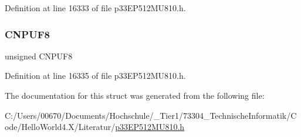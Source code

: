Definition at line 16333 of file p33\+E\+P512\+M\+U810.\+h.

\mbox{\label{structtag_c_n_p_u_f_b_i_t_s_a4debecf6737596811c06632883f11d3f}} 
\subsubsection{\texorpdfstring{C\+N\+P\+U\+F8}{CNPUF8}}
{\footnotesize\ttfamily unsigned C\+N\+P\+U\+F8}



Definition at line 16335 of file p33\+E\+P512\+M\+U810.\+h.



The documentation for this struct was generated from the following file\+:\begin{DoxyCompactItemize}
\item 
C\+:/\+Users/00670/\+Documents/\+Hochschule/\+\_\+\+Tier1/73304\+\_\+\+Technische\+Informatik/\+Code/\+Hello\+World4.\+X/\+Literatur/\hyperlink{p33_e_p512_m_u810_8h}{p33\+E\+P512\+M\+U810.\+h}\end{DoxyCompactItemize}
